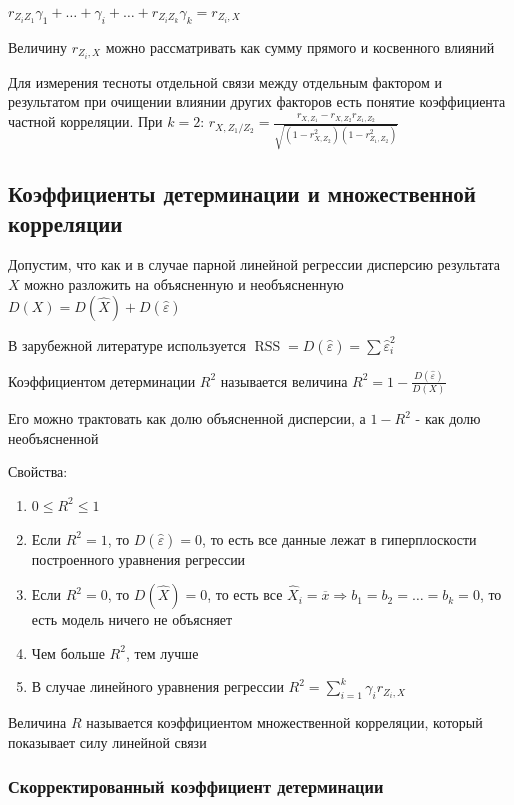 \documentclass[12pt]{article}
\begin{document}
$r_{Z_i Z_1} \gamma_1 + \dots + \gamma_i + \dots + r_{Z_i Z_k} \gamma_k = r_{Z_i, X}$

Величину $r_{Z_i, X}$ можно рассматривать как сумму прямого и косвенного влияний

\Nota Для измерения тесноты отдельной связи между отдельным фактором и результатом при очищении влиянии других факторов
есть понятие коэффициента частной корреляции. При $k = 2$: $r_{X, Z_1 / Z_2} = \frac{r_{X, Z_1} - r_{X, Z_2} r_{Z_1, Z_2}}{\sqrt{(1 - r_{X, Z_2}^2)(1 - r_{Z_1, Z_2}^2)}}$


\subsection{Коэффициенты детерминации и множественной корреляции}

Допустим, что как и в случае парной линейной регрессии дисперсию результата $X$ можно разложить на объясненную и необъясненную $D(X) = D(\hat X) + D(\hat \varepsilon)$

\Nota В зарубежной литературе используется $\operatorname{RSS} = D(\hat \varepsilon) = \sum \hat \varepsilon_i^2$

\Def Коэффициентом детерминации $R^2$ называется величина $R^2 = 1 - \frac{D(\hat \varepsilon)}{D(X)}$

Его можно трактовать как долю объясненной дисперсии, а $1 - R^2$ - как долю необъясненной

Свойства:

\begin{enumerate}
    \item $0 \leq R^2 \leq 1$
    \item Если $R^2 = 1$, то $D(\hat \varepsilon) = 0$, то есть все данные лежат в гиперплоскости построенного уравнения регрессии
    \item Если $R^2 = 0$, то $D(\hat X) = 0$, то есть все $\hat X_i = \overline{x} \Longrightarrow b_1 = b_2 = \dots = b_k = 0$, то есть модель ничего не объясняет
    \item Чем больше $R^2$, тем лучше
    \item В случае линейного уравнения регрессии $R^2 = \sum_{i = 1}^k \gamma_i r_{Z_i, X}$
\end{enumerate}

\Def Величина $R$ называется коэффициентом множественной корреляции, который показывает силу линейной связи

\subsubsection{Скорректированный коэффициент детерминации}
\end{document}
